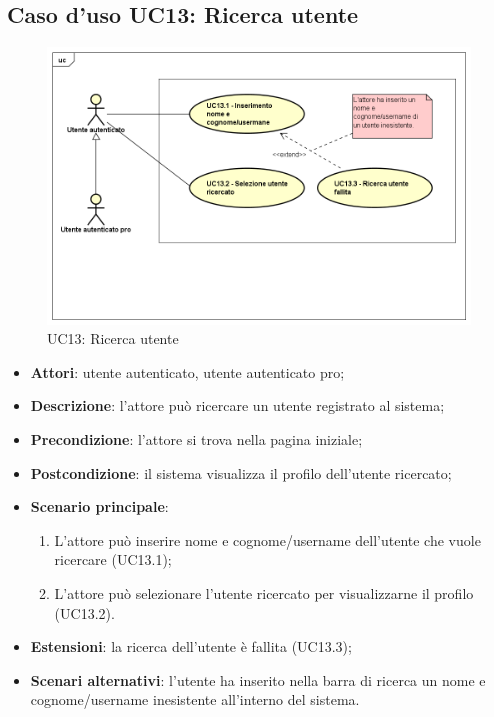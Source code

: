 \newpage
\subsection{Caso d'uso UC13: Ricerca utente}
\label{UC13}
\begin{figure}[h]
	\centering
	\includegraphics[scale=0.5]{UML/UC13.png}
	\caption{UC13: Ricerca utente}
\end{figure}
\FloatBarrier
\begin{itemize}
	\item \textbf{Attori}: utente autenticato, utente autenticato pro;
	\item \textbf{Descrizione}: l'attore può ricercare un utente registrato al sistema;
	\item \textbf{Precondizione}: l'attore si trova nella pagina iniziale;
	\item \textbf{Postcondizione}: il sistema visualizza il profilo dell'utente ricercato;
	\item \textbf{Scenario principale}:
	\begin{enumerate}
		\item L'attore può inserire nome e cognome/username dell'utente che vuole ricercare (UC13.1);
		\item L'attore può selezionare l'utente ricercato per visualizzarne il profilo (UC13.2).
	\end{enumerate} 
	\item \textbf{Estensioni}: la ricerca dell'utente è fallita (UC13.3);
	\item \textbf{Scenari alternativi}: l'utente ha inserito nella barra di ricerca un nome e cognome/username inesistente all'interno del sistema. 
\end{itemize}

